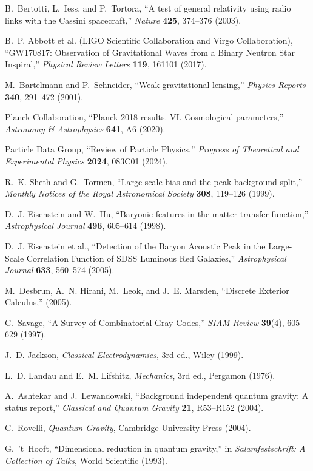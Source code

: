 \documentclass[12pt,a4paper]{article}
\begin{document}
\begin{thebibliography}{99}
B.~Bertotti, L.~Iess, and P.~Tortora,
``A test of general relativity using radio links with the Cassini spacecraft,''
\emph{Nature} \textbf{425}, 374--376 (2003).

B.~P. Abbott et al. (LIGO Scientific Collaboration and Virgo Collaboration),
``GW170817: Observation of Gravitational Waves from a Binary Neutron Star Inspiral,''
\emph{Physical Review Letters} \textbf{119}, 161101 (2017).

M.~Bartelmann and P.~Schneider,
``Weak gravitational lensing,''
\emph{Physics Reports} \textbf{340}, 291--472 (2001).

Planck Collaboration,
``Planck 2018 results. VI. Cosmological parameters,''
\emph{Astronomy \& Astrophysics} \textbf{641}, A6 (2020).

Particle Data Group,
``Review of Particle Physics,''
\emph{Progress of Theoretical and Experimental Physics} \textbf{2024}, 083C01 (2024).

R.~K. Sheth and G.~Tormen,
``Large-scale bias and the peak-background split,''
\emph{Monthly Notices of the Royal Astronomical Society} \textbf{308}, 119--126 (1999).

D.~J. Eisenstein and W.~Hu,
``Baryonic features in the matter transfer function,''
\emph{Astrophysical Journal} \textbf{496}, 605--614 (1998).

D.~J. Eisenstein et al.,
``Detection of the Baryon Acoustic Peak in the Large-Scale Correlation Function of SDSS Luminous Red Galaxies,''
\emph{Astrophysical Journal} \textbf{633}, 560--574 (2005).

M.~Desbrun, A.~N. Hirani, M.~Leok, and J.~E. Marsden,
``Discrete Exterior Calculus,'' (2005).

C.~Savage,
``A Survey of Combinatorial Gray Codes,''
\emph{SIAM Review} \textbf{39}(4), 605--629 (1997).

J.~D. Jackson,
\emph{Classical Electrodynamics}, 3rd ed.,
Wiley (1999).

L.~D. Landau and E.~M. Lifshitz,
\emph{Mechanics}, 3rd ed.,
Pergamon (1976).

A.~Ashtekar and J.~Lewandowski,
``Background independent quantum gravity: A status report,''
\emph{Classical and Quantum Gravity} \textbf{21}, R53--R152 (2004).

C.~Rovelli,
\emph{Quantum Gravity},
Cambridge University Press (2004).

G.~'t~Hooft,
``Dimensional reduction in quantum gravity,''
in \emph{Salamfestschrift: A Collection of Talks}, World Scientific (1993).

\end{thebibliography}
\end{document}

